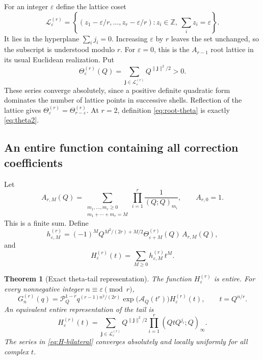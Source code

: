 \documentclass[11pt]{article}
\numberwithin{equation}{section}
\newtheorem{theorem}{Theorem}[section]
\theoremstyle{definition}
\newcommand{\Z}{\mathbb Z}
\newcommand{\pp}[1]{(Q;Q)_{#1}}
\newcommand{\Pinf}{\mathcal P_Q}
\newcommand{\A}{\mathcal A_Q}
\newcommand{\eps}{\varepsilon}
\newcommand{\T}{\Theta}
\begin{document}
For an integer $\eps$ define the lattice coset
\begin{equation}\label{eq:Lattice}
 \mathcal L_{\eps}^{(r)}=
 \left\{(z_1-\eps/r,\ldots,z_r-\eps/r):
 z_i\in\Z,\ \sum_i z_i=\eps\right\}.
\end{equation}
It lies in the hyperplane $\sum_i j_i=0$. Increasing $\eps$ by $r$ leaves the set unchanged, so the subscript is understood modulo $r$. For $\eps=0$, this is the $A_{r-1}$ root lattice in its usual Euclidean realization. Put
\begin{equation}\label{eq:root-theta}
 \T_{\eps}^{(r)}(Q)=
 \sum_{\boldsymbol j\in\mathcal L_{\eps}^{(r)}}
 Q^{\|\boldsymbol j\|^2/2}>0.
\end{equation}
These series converge absolutely, since a positive definite quadratic form dominates the number of lattice points in successive shells. Reflection of the lattice gives
$\T_{\eps}^{(r)}=\T_{r-\eps}^{(r)}$. At $r=2$, definition \eqref{eq:root-theta} is exactly \eqref{eq:theta2}.

\subsection{An entire function containing all correction coefficients}

Let
\begin{equation}\label{eq:comp-coeff}
 A_{r,M}(Q)=
 \sum_{\substack{m_1,\ldots,m_r\ge0\\m_1+\cdots+m_r=M}}
 \prod_{i=1}^r\frac1{\pp{m_i}},\qquad A_{r,0}=1.
\end{equation}
This is a finite sum. Define
\begin{equation}\label{eq:h-coeff}
 h_{\eps,M}^{(r)}=
 (-1)^M Q^{M^2/(2r)+M/2}\T_{\eps+M}^{(r)}(Q)\,A_{r,M}(Q),
\end{equation}
and
\begin{equation}\label{eq:H-entire}
 H_{\eps}^{(r)}(t)=\sum_{M\ge0}h_{\eps,M}^{(r)}t^M.
\end{equation}

\begin{theorem}[Exact theta-tail representation]\label{thm:theta-tail}
The function $H_{\eps}^{(r)}$ is entire. For every nonnegative integer $n\equiv\eps\pmod r$,
\begin{equation}\label{eq:Galois-exact}
 \boxed{\displaystyle
 G_n^{(r)}(q)=\Pinf^{1-r}
 q^{(r-1)n^2/(2r)}
 \exp\!\bigl(\A(t^r)\bigr)H_{\eps}^{(r)}(t),
 \qquad t=Q^{n/r}.}
\end{equation}
An equivalent entire representation of the tail is
\begin{equation}\label{eq:H-bilateral}
 H_{\eps}^{(r)}(t)=
 \sum_{\boldsymbol j\in\mathcal L_{\eps}^{(r)}}
 Q^{\|\boldsymbol j\|^2/2}
 \prod_{i=1}^r(QtQ^{j_i};Q)_\infty.
\end{equation}
The series in \eqref{eq:H-bilateral} converges absolutely and locally uniformly for all complex $t$.
\end{theorem}
\end{document}
